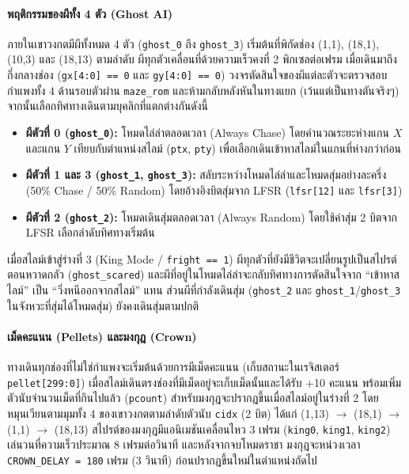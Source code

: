\paragraph{พฤติกรรมของผีทั้ง 4 ตัว (Ghost AI)}
ภายในเขาวงกตมีผีทั้งหมด 4 ตัว (\texttt{ghost\_0} ถึง \texttt{ghost\_3}) เริ่มต้นที่พิกัดช่อง (1,1), (18,1), (10,3) และ (18,13) ตามลำดับ ผีทุกตัวเคลื่อนที่ด้วยความเร็วคงที่ 2 พิกเซลต่อเฟรม เมื่อเดินมาถึงกึ่งกลางช่อง (\texttt{gx[4:0] == 0} และ \texttt{gy[4:0] == 0}) วงจรตัดสินใจของผีแต่ละตัวจะตรวจสอบกำแพงทั้ง 4 ด้านรอบตัวผ่าน \texttt{maze\_rom} และห้ามกลับหลังหันในทางแยก (เว้นแต่เป็นทางตันจริงๆ) จากนั้นเลือกทิศทางเดินตามบุคลิกที่แตกต่างกันดังนี้
\begin{itemize}[leftmargin=1.5cm]
    \item \textbf{ผีตัวที่ 0 (\texttt{ghost\_0}):} โหมดไล่ล่าตลอดเวลา (Always Chase) โดยคำนวณระยะห่างแกน $X$ และแกน $Y$ เทียบกับตำแหน่งสไลม์ (\texttt{ptx}, \texttt{pty}) เพื่อเลือกเดินเข้าหาสไลม์ในแกนที่ห่างกว่าก่อน
    \item \textbf{ผีตัวที่ 1 และ 3 (\texttt{ghost\_1}, \texttt{ghost\_3}):} สลับระหว่างโหมดไล่ล่าและโหมดสุ่มอย่างละครึ่ง (50\% Chase / 50\% Random) โดยอ้างอิงบิตสุ่มจาก LFSR (\texttt{lfsr[12]} และ \texttt{lfsr[3]})
    \item \textbf{ผีตัวที่ 2 (\texttt{ghost\_2}):} โหมดเดินสุ่มตลอดเวลา (Always Random) โดยใช้ค่าสุ่ม 2 บิตจาก LFSR เลือกลำดับทิศทางเริ่มต้น
\end{itemize}
เมื่อสไลม์เข้าสู่ร่างที่ 3 (King Mode / \texttt{fright == 1}) ผีทุกตัวที่ยังมีชีวิตจะเปลี่ยนรูปเป็นสไปรต์ตอนหวาดกลัว (\texttt{ghost\_scared}) และผีที่อยู่ในโหมดไล่ล่าจะกลับทิศทางการตัดสินใจจาก “เข้าหาสไลม์” เป็น “วิ่งหนีออกจากสไลม์” แทน ส่วนผีที่กำลังเดินสุ่ม (\texttt{ghost\_2} และ \texttt{ghost\_1}/\texttt{ghost\_3} ในจังหวะที่สุ่มได้โหมดสุ่ม) ยังคงเดินสุ่มตามปกติ

\paragraph{เม็ดคะแนน (Pellets) และมงกุฎ (Crown)}
ทางเดินทุกช่องที่ไม่ใช่กำแพงจะเริ่มต้นด้วยการมีเม็ดคะแนน (เก็บสถานะในเรจิสเตอร์ \texttt{pellet[299:0]}) เมื่อสไลม์เดินตรงช่องที่มีเม็ดอยู่จะเก็บเม็ดนั้นและได้รับ +10 คะแนน พร้อมเพิ่มตัวนับจำนวนเม็ดที่กินไปแล้ว (\texttt{pcount}) สำหรับมงกุฎจะปรากฏขึ้นเมื่อสไลม์อยู่ในร่างที่ 2 โดยหมุนเวียนตามมุมทั้ง 4 ของเขาวงกตตามลำดับตัวนับ \texttt{cidx} (2 บิต) ได้แก่ (1,13) $\rightarrow$ (18,1) $\rightarrow$ (1,1) $\rightarrow$ (18,13) สไปรต์ของมงกุฎมีแอนิเมชันเคลื่อนไหว 3 เฟรม (\texttt{king0}, \texttt{king1}, \texttt{king2}) เล่นวนที่ความเร็วประมาณ 8 เฟรมต่อวินาที และหลังจากจบโหมดราชา มงกุฎจะหน่วงเวลา \texttt{CROWN\_DELAY = 180} เฟรม (3 วินาที) ก่อนปรากฏขึ้นใหม่ในตำแหน่งถัดไป

